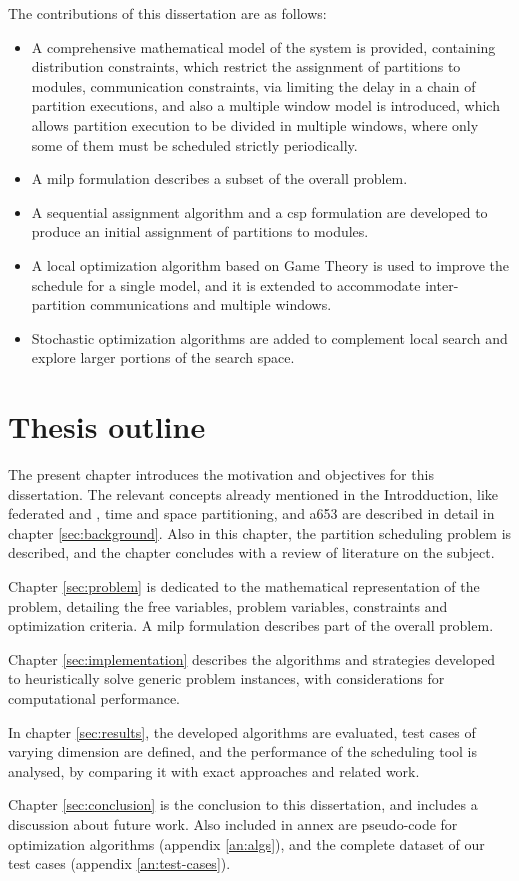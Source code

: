 \documentclass[main.tex]{subfiles}
\begin{document}
The contributions of this dissertation are as follows:
\begin{itemize}
    \item A comprehensive mathematical model of the system is provided, containing distribution constraints, which restrict the assignment of partitions to modules, communication constraints, via limiting the delay in a chain of partition executions, and also a multiple window model is introduced, which allows partition execution to be divided in multiple windows, where only some of them must be scheduled strictly periodically.
    \item A \gls{milp} formulation describes a subset of the overall problem.
    \item A sequential assignment algorithm and a \gls{csp} formulation are developed to produce an initial assignment of partitions to modules.
    \item A local optimization algorithm based on Game Theory \cite{al2012strictly} is used to improve the schedule for a single model, and it is extended to accommodate inter-partition communications and multiple windows.
    \item Stochastic optimization algorithms are added to complement local search and explore larger portions of the search space.
\end{itemize}

\section{Thesis outline}

The present chapter introduces the motivation and objectives for this dissertation.
The relevant concepts already mentioned in the Introdduction, like federated and , time and space partitioning, and \gls{a653} are described in detail in chapter \ref{sec:background}.
Also in this chapter, the partition scheduling problem is described, and the chapter concludes with a review of literature on the subject.

Chapter \ref{sec:problem} is dedicated to the mathematical representation of the problem, detailing the free variables, problem variables, constraints and optimization criteria.
A \gls{milp} formulation describes part of the overall problem.

Chapter \ref{sec:implementation} describes the algorithms and strategies developed to heuristically solve generic problem instances, with considerations for computational performance.

In chapter \ref{sec:results}, the developed algorithms are evaluated, test cases of varying dimension are defined, and the performance of the scheduling tool is analysed, by comparing it with exact approaches and related work.

Chapter \ref{sec:conclusion} is the conclusion to this dissertation, and includes a discussion about future work.
Also included in annex are pseudo-code for optimization algorithms (appendix \ref{an:algs}), and the complete dataset of our test cases (appendix \ref{an:test-cases}).
\end{document}

